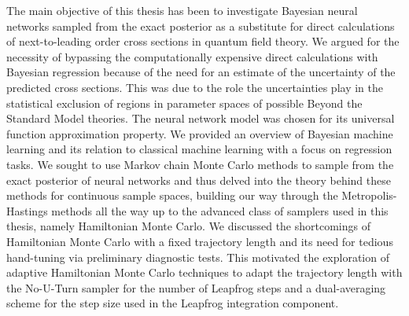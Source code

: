 The main objective of this thesis has been to investigate Bayesian neural networks sampled from the exact posterior as a substitute for direct calculations of next-to-leading order cross sections in quantum field theory. We argued for the necessity of bypassing the computationally expensive direct calculations with Bayesian regression because of the need for an estimate of the uncertainty of the predicted cross sections. This was due to the role the uncertainties play in the statistical exclusion of regions in parameter spaces of possible Beyond the Standard Model theories. The neural network model was chosen for its universal function approximation property. We provided an overview of Bayesian machine learning and its relation to classical machine learning with a focus on regression tasks. We sought to use Markov chain Monte Carlo methods to sample from the exact posterior of neural networks and thus delved into the theory behind these methods for continuous sample spaces, building our way through the Metropolis-Hastings methods all the way up to the advanced class of samplers used in this thesis, namely Hamiltonian Monte Carlo. We discussed the shortcomings of Hamiltonian Monte Carlo with a fixed trajectory length and its need for tedious hand-tuning via preliminary diagnostic tests. This motivated the exploration of adaptive Hamiltonian Monte Carlo techniques to adapt the trajectory length with the No-U-Turn sampler for the number of Leapfrog steps and a dual-averaging scheme for the step size used in the Leapfrog integration component. 

